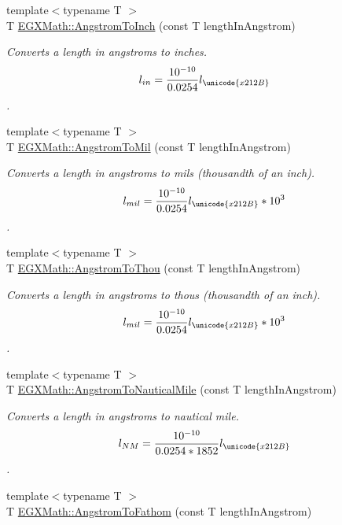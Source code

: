 \begin{DoxyCompactItemize}
{\footnotesize template$<$typename T $>$ }\\T \mbox{\hyperlink{group___e_g_x_math-_conversions-_length_conversions-_non-_s_i-_angstrom-_imperial_ga7866f39e7fdf861be15eda81aa1b3f0c}{E\+G\+X\+Math\+::\+Angstrom\+To\+Inch}} (const T length\+In\+Angstrom)
\begin{DoxyCompactList}\small\item\em Converts a length in angstroms to inches. \[ l_{in}= \frac{10^{-10}}{0.0254} l_{\unicode{x212B}} \]. \end{DoxyCompactList}\item 
{\footnotesize template$<$typename T $>$ }\\T \mbox{\hyperlink{group___e_g_x_math-_conversions-_length_conversions-_non-_s_i-_angstrom-_imperial_gae8d17e18786a104634ccfa6b9f46f314}{E\+G\+X\+Math\+::\+Angstrom\+To\+Mil}} (const T length\+In\+Angstrom)
\begin{DoxyCompactList}\small\item\em Converts a length in angstroms to mils (thousandth of an inch). \[ l_{mil}= \frac{10^{-10}}{0.0254} l_{\unicode{x212B}} * 10^{3} \]. \end{DoxyCompactList}\item 
{\footnotesize template$<$typename T $>$ }\\T \mbox{\hyperlink{group___e_g_x_math-_conversions-_length_conversions-_non-_s_i-_angstrom-_imperial_gafdf126044e17b0d3e0d83e510ba11990}{E\+G\+X\+Math\+::\+Angstrom\+To\+Thou}} (const T length\+In\+Angstrom)
\begin{DoxyCompactList}\small\item\em Converts a length in angstroms to thous (thousandth of an inch). \[ l_{mil}= \frac{10^{-10}}{0.0254} l_{\unicode{x212B}} * 10^{3} \]. \end{DoxyCompactList}\item 
{\footnotesize template$<$typename T $>$ }\\T \mbox{\hyperlink{group___e_g_x_math-_conversions-_length_conversions-_non-_s_i-_angstrom-_nautical_ga4be465819cdcbfd7da046440844f5d82}{E\+G\+X\+Math\+::\+Angstrom\+To\+Nautical\+Mile}} (const T length\+In\+Angstrom)
\begin{DoxyCompactList}\small\item\em Converts a length in angstroms to nautical mile. \[ l_{NM}= \frac{10^{-10}}{0.0254 * 1852} l_{\unicode{x212B}} \]. \end{DoxyCompactList}\item 
{\footnotesize template$<$typename T $>$ }\\T \mbox{\hyperlink{group___e_g_x_math-_conversions-_length_conversions-_non-_s_i-_angstrom-_nautical_gab7a96e419622057d8fcce5af11ae0a9a}{E\+G\+X\+Math\+::\+Angstrom\+To\+Fathom}} (const T length\+In\+Angstrom)

\end{DoxyCompactItemize}
